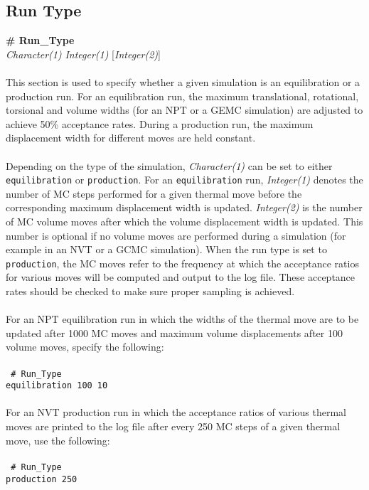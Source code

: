 \subsection{Run Type}\label{sec:Run_Type}
{\bf \# Run\_Type} \\
{\it Character(1)} {\it Integer(1)} [{\it Integer(2)}] \\ \\
%
This section is used to specify whether a given simulation is an equilibration or a production run.
For an equilibration run, the maximum translational, rotational, torsional and volume widths (for an NPT or a GEMC
simulation) are adjusted to achieve 50\% acceptance rates. During a production run, the maximum
displacement width for different moves are held constant. \\ \\
%
Depending on the type of the simulation,
{\it Character(1)} can be set to either \texttt{equilibration} or \texttt{production}.  
For an \texttt{equilibration} run, {\it Integer(1)} denotes
the number of MC steps performed for a given thermal move before the corresponding maximum
displacement width is updated. {\it Integer(2)} is the number of MC volume moves after which the volume
displacement width is updated. This number is optional if no volume moves are performed during a simulation (for example in an NVT or
a GCMC simulation). When the run type is set to \texttt{production}, the MC moves refer to the frequency at which the acceptance
ratios for various moves will be computed and output to the log file. These acceptance rates should be checked to make sure proper sampling is achieved. \\ \\
%
For an NPT equilibration run in which the widths of the thermal move are to be updated after 1000 MC moves and
maximum volume displacements after 100 volume moves, specify the following: \\ \\
%
\texttt{
\# Run\_Type \\
equilibration 100 10 \\ \\}
%
% 
For an NVT production run in which the acceptance ratios of various thermal moves are printed to the log file after
every 250 MC steps of a given thermal move, use the following: \\ \\
%
\texttt{
\# Run\_Type \\
production 250}
%
%
%
